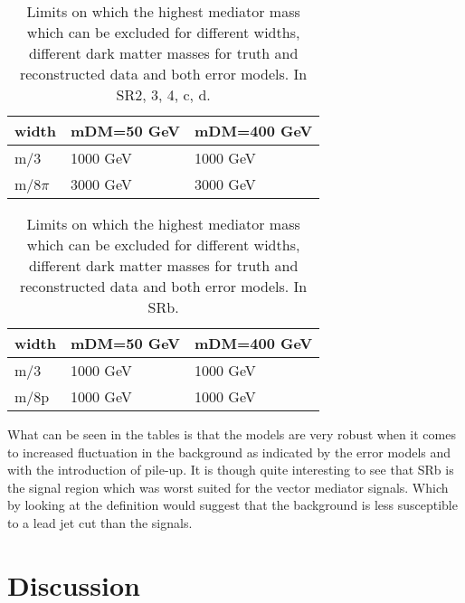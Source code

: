 \begin{table}[ht]
\begin{center}
\begin{tabular}{|l|l|l|}
\hline
width & mDM=50 GeV & mDM=400 GeV \\ \hline
m/3 & 1000 GeV & 1000 GeV \\ \hline
m/$8\pi$ & 3000 GeV & 3000 GeV\\ \hline
\end{tabular}
\caption{Limits on which the highest mediator mass which can be excluded for different widths, different dark matter masses for truth and reconstructed data and both error models. In SR2, 3, 4, c, d.}
\label{tab:mediatorpass}
\end{center}
\end{table}
\begin{table}[ht]
\begin{center}
\begin{tabular}{|l|l|l|}
\hline
width & mDM=50 GeV & mDM=400 GeV \\ \hline
m/3 & 1000 GeV & 1000 GeV\\ \hline
m/8p & 1000 GeV & 1000 GeV\\ \hline
\end{tabular}
\caption{Limits on which the highest mediator mass which can be excluded for different widths, different dark matter masses for truth and reconstructed data and both error models. In SRb.}
\label{tab:mediatorpass2}
\end{center}
\end{table}

What can be seen in the tables is that the models are very robust when it comes to increased fluctuation in the background as indicated by the error models and with the introduction of pile-up. It is though quite interesting to see that SRb is the signal region which was worst suited for the vector mediator signals. Which by looking at the definition would suggest that the background is less susceptible to a lead jet cut than the signals.

\newpage
\section{Discussion}
